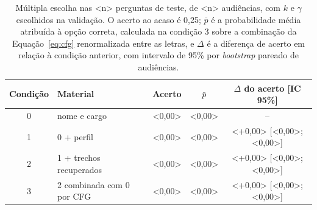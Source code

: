 \begin{table}[tbp]
  \centering
  \caption{Múltipla escolha nas <n> perguntas de teste, de <n> audiências, com $k$ e $\gamma$
  escolhidos na validação. O acerto ao acaso é 0,25; $\bar{p}$ é a probabilidade média atribuída à
  opção correta, calculada na condição 3 sobre a combinação da Equação~\ref{eq:cfg} renormalizada
  entre as letras, e $\Delta$ é a diferença de acerto em relação à condição anterior, com intervalo de
  95\% por \textit{bootstrap} pareado de audiências.}
  \label{tab:resultados}
  \small
  \begin{tabular}{clccc}
    \toprule
    \textbf{Condição} & \textbf{Material} & \textbf{Acerto} & $\bar{p}$ & $\Delta$ \textbf{do acerto [IC 95\%]} \\
    \midrule
    0 & nome e cargo                   & <0,00> & <0,00> & -- \\
    1 & 0 + perfil                     & <0,00> & <0,00> & <+0,00> [<0,00>; <0,00>] \\
    2 & 1 + trechos recuperados        & <0,00> & <0,00> & <+0,00> [<0,00>; <0,00>] \\
    3 & 2 combinada com 0 por CFG      & <0,00> & <0,00> & <+0,00> [<0,00>; <0,00>] \\
    \bottomrule
  \end{tabular}
\end{table}
